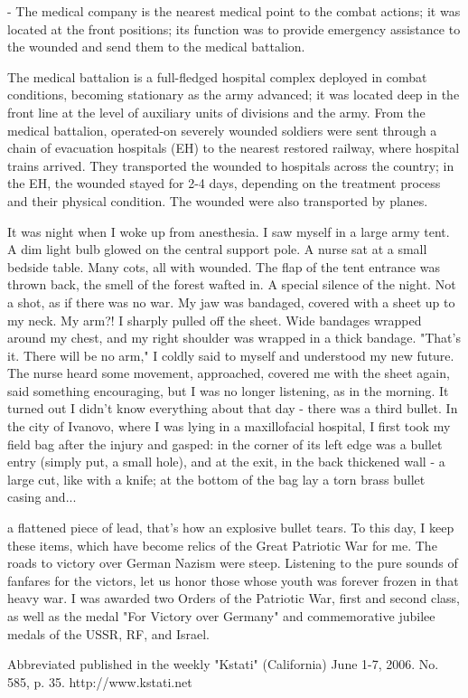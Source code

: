 \label{12-2}
- The medical company is the nearest medical point to the combat actions; it was located at the front positions; its function was to provide emergency assistance to the wounded and send them to the medical battalion.

\label{12-3}
The medical battalion is a full-fledged hospital complex deployed in combat conditions, becoming stationary as the army advanced; it was located deep in the front line at the level of auxiliary units of divisions and the army. From the medical battalion, operated-on severely wounded soldiers were sent through a chain of evacuation hospitals (EH) to the nearest restored railway, where hospital trains arrived. They transported the wounded to hospitals across the country; in the EH, the wounded stayed for 2-4 days, depending on the treatment process and their physical condition. The wounded were also transported by planes.

\label{13-1}
It was night when I woke up from anesthesia. I saw myself in a large army tent. A dim light bulb glowed on the central support pole. A nurse sat at a small bedside table. Many cots, all with wounded. The flap of the tent entrance was thrown back, the smell of the forest wafted in. A special silence of the night. Not a shot, as if there was no war. My jaw was bandaged, covered with a sheet up to my neck. My arm?! I sharply pulled off the sheet. Wide bandages wrapped around my chest, and my right shoulder was wrapped in a thick bandage. "That's it. There will be no arm," I coldly said to myself and understood my new future. The nurse heard some movement, approached, covered me with the sheet again, said something encouraging, but I was no longer listening, as in the morning. It turned out I didn't know everything about that day - there was a third bullet. In the city of Ivanovo, where I was lying in a maxillofacial hospital, I first took my field bag after the injury and gasped: in the corner of its left edge was a bullet entry (simply put, a small hole), and at the exit, in the back thickened wall - a large cut, like with a knife; at the bottom of the bag lay a torn brass bullet casing and...

\label{14-1}
a flattened piece of lead, that's how an explosive bullet tears. To this day, I keep these items, which have become relics of the Great Patriotic War for me. The roads to victory over German Nazism were steep. Listening to the pure sounds of fanfares for the victors, let us honor those whose youth was forever frozen in that heavy war. I was awarded two Orders of the Patriotic War, first and second class, as well as the medal "For Victory over Germany" and commemorative jubilee medals of the USSR, RF, and Israel.

\label{14-2}
Abbreviated published in the weekly "Kstati" (California) June 1-7, 2006. No. 585, p. 35. http://www.kstati.net
